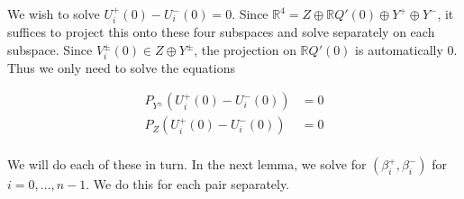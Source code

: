 \documentclass[12pt]{article}
\def\R{{\mathbb R}}
\begin{document}
We wish to solve $U_i^+(0) - U_i^-(0) = 0$. Since $\R^4 = Z \oplus \R Q'(0) \oplus Y^+ \oplus Y^-$, it suffices to project this onto these four subspaces and solve separately on each subspace. Since $V_i^\pm(0) \in Z \oplus Y^\pm$, the projection on $\R Q'(0)$ is automatically 0. Thus we only need to solve the equations

\begin{align*}
P_{Y^\pm}(U_i^+(0) - U_i^-(0)) &= 0 \\
P_Z(U_i^+(0) - U_i^-(0)) &= 0 \\
\end{align*}

We will do each of these in turn. In the next lemma, we solve for $(\beta_i^+, \beta_i^-)$ for $i = 0, \dots, n-1$. We do this for each pair separately.

\end{document}

